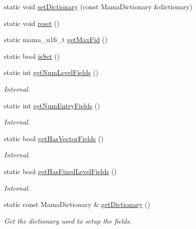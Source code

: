\begin{CompactItemize}
\item 
static void \hyperlink{classWombat_1_1MamdaOrderBookFields_3d622bb24f97096258fc46622e586245}{set\-Dictionary} (const Mama\-Dictionary \&dictionary)
\item 
static void \hyperlink{classWombat_1_1MamdaOrderBookFields_b1747b309cee6f9140434a2472d7a8e7}{reset} ()
\item 
static mama\_\-u16\_\-t \hyperlink{classWombat_1_1MamdaOrderBookFields_5074b0085379448da33287231d63a3a9}{get\-Max\-Fid} ()
\item 
static bool \hyperlink{classWombat_1_1MamdaOrderBookFields_1ce2d061ca668c45263e6fe9f71df6e1}{is\-Set} ()
\item 
static int \hyperlink{classWombat_1_1MamdaOrderBookFields_677cc576cc2746f93e16955da0901052}{get\-Num\-Level\-Fields} ()
\begin{CompactList}\small\item\em Internal. \item\end{CompactList}\item 
static int \hyperlink{classWombat_1_1MamdaOrderBookFields_f409d69017eeecc76221e1dfb4f75ffe}{get\-Num\-Entry\-Fields} ()
\begin{CompactList}\small\item\em Internal. \item\end{CompactList}\item 
static bool \hyperlink{classWombat_1_1MamdaOrderBookFields_cbae2a4519faa1c9dbe8a6d2694d3618}{get\-Has\-Vector\-Fields} ()
\begin{CompactList}\small\item\em Internal. \item\end{CompactList}\item 
static bool \hyperlink{classWombat_1_1MamdaOrderBookFields_d3ed0b8d3b8d4f3c0f13ce9b4ca378b5}{get\-Has\-Fixed\-Level\-Fields} ()
\begin{CompactList}\small\item\em Internal. \item\end{CompactList}\item 
static const Mama\-Dictionary \& \hyperlink{classWombat_1_1MamdaOrderBookFields_beff72a3c0730d7cbb55bcc717af13cc}{get\-Dictionary} ()
\begin{CompactList}\small\item\em Get the dictionary used to setup the fields. \item\end{CompactList}\end{CompactItemize}
